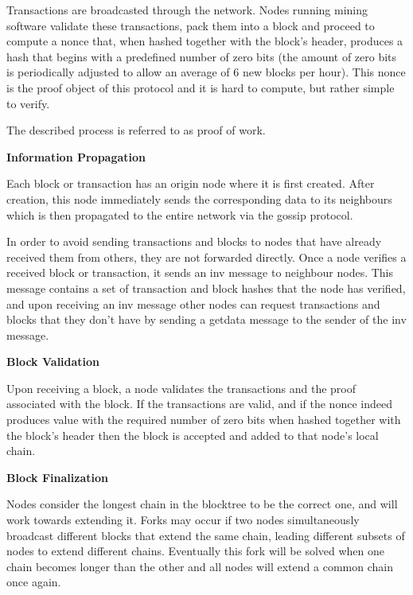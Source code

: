 Transactions are broadcasted through the network. Nodes running mining software validate these transactions, pack them into a block and proceed to compute a nonce that, when hashed together with the block’s header, produces a hash that begins with a predefined number of zero bits (the amount of zero bits is periodically adjusted to allow an average of 6 new blocks per hour). This nonce is the proof object of this protocol and it is hard to compute, but rather simple to verify.

The described process is referred to as proof of work.

\vspace{0.25cm}


\textbf{Information Propagation}

Each block or transaction has an origin node where it is first created. After creation, this node immediately sends the corresponding data to its neighbours which is then propagated to the entire network via the gossip protocol.

In order to avoid sending transactions and blocks to nodes that have already received them from others, they are not forwarded directly. Once  a node verifies a received block or transaction, it sends an inv message to neighbour nodes. This message contains a set of transaction and block hashes that the node has verified, and upon receiving an inv message other nodes can request transactions and blocks that they don’t have by sending a getdata message to the sender of the inv message.

\vspace{0.25cm}

\textbf{Block Validation}

Upon receiving a block, a node validates the transactions and the proof associated with the block. If the transactions are valid, and if the nonce indeed produces value with the required number of zero bits when hashed together with the block’s header then the block is accepted and added to that node’s local chain.

\vspace{0.25cm}

\textbf{Block Finalization}

Nodes consider the longest chain in the blocktree to be the correct one, and will work towards extending it. Forks may occur if two nodes simultaneously broadcast different blocks that extend the same chain, leading different subsets of nodes to extend different chains. Eventually this fork will be solved when one chain becomes longer than the other and all nodes will extend a common chain once again.

